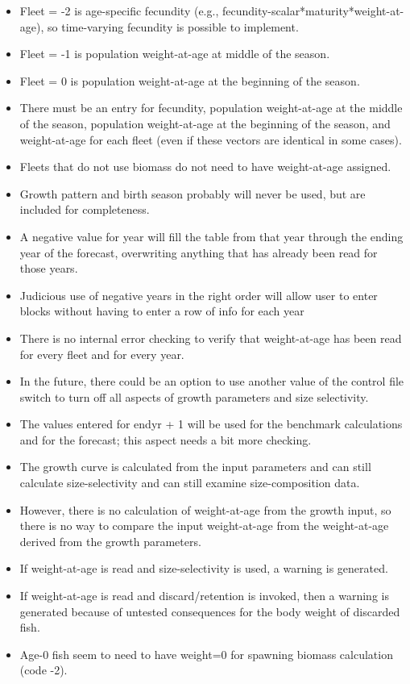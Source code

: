 \begin{itemize}
	\item Fleet = -2 is age-specific fecundity (e.g., fecundity-scalar*maturity*weight-at-age), so time-varying fecundity is possible to implement.
	\item Fleet = -1 is population weight-at-age at middle of the season.
	\item Fleet = 0 is population weight-at-age at the beginning of the season.
	\item There must be an entry for fecundity, population weight-at-age at the middle of the season, population weight-at-age at the beginning of the season, and weight-at-age for each fleet (even if these vectors are identical in some cases).
	\item Fleets that do not use biomass do not need to have weight-at-age assigned.
	\item Growth pattern and birth season probably will never be used, but are included for completeness.
	\item A negative value for year will fill the table from that year through the ending year of the forecast, overwriting anything that has already been read for those years.
	\item Judicious use of negative years in the right order will allow user to enter blocks without having to enter a row of info for each year
	\item There is no internal error checking to  verify that weight-at-age has been read for every fleet and for every year.
	\item In the future, there could be an option to use another value of the control file switch to turn off all aspects of growth parameters and size selectivity.
	\item The values entered for endyr + 1 will be used for the benchmark calculations and for the forecast; this aspect needs a bit more checking.
\end{itemize}


		 \begin{itemize}
			\item The growth curve is calculated from the input parameters and can still calculate size-selectivity and can still examine size-composition data.
			\item However, there is no calculation of weight-at-age from the growth input, so there is no way to compare the input weight-at-age from the weight-at-age derived from the growth parameters.
			\item If weight-at-age is read and size-selectivity is used, a warning is generated.
			\item If weight-at-age is read and discard/retention is invoked, then a warning is generated because of untested consequences for the body weight of discarded fish.
			\item Age-0 fish seem to need to have weight=0 for spawning biomass calculation (code -2).
		\end{itemize}

